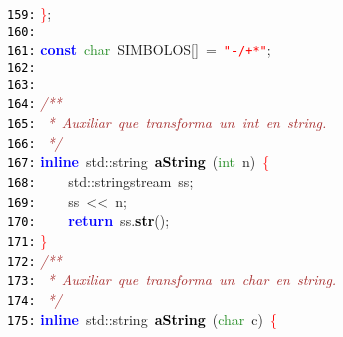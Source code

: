 \documentclass[a4paper,10pt]{scrartcl}
\begin{document}
{   \mbox{}\texttt{\textcolor{Black}{159:}} \textcolor{Red}{\}}\textcolor{BrickRed}{;} \\
   \mbox{}\texttt{\textcolor{Black}{160:}}  \\
   \mbox{}\texttt{\textcolor{Black}{161:}} \textbf{\textcolor{Blue}{const}}\ \textcolor{ForestGreen}{char}\ SIMBOLOS\textcolor{BrickRed}{[]}\ \textcolor{BrickRed}{=}\ \texttt{\textcolor{Red}{"{}-/+*"{}}}\textcolor{BrickRed}{;} \\
   \mbox{}\texttt{\textcolor{Black}{162:}}  \\
   \mbox{}\texttt{\textcolor{Black}{163:}}  \\
   \mbox{}\texttt{\textcolor{Black}{164:}} \textit{\textcolor{Brown}{/**}} \\
   \mbox{}\texttt{\textcolor{Black}{165:}} \textit{\textcolor{Brown}{\ *\ Auxiliar\ que\ transforma\ un\ int\ en\ string.}} \\
   \mbox{}\texttt{\textcolor{Black}{166:}} \textit{\textcolor{Brown}{\ */}} \\
   \mbox{}\texttt{\textcolor{Black}{167:}} \textbf{\textcolor{Blue}{inline}}\ std\textcolor{BrickRed}{::}\textcolor{TealBlue}{string}\ \textbf{\textcolor{Black}{aString}}\ \textcolor{BrickRed}{(}\textcolor{ForestGreen}{int}\ n\textcolor{BrickRed}{)}\ \textcolor{Red}{\{} \\
   \mbox{}\texttt{\textcolor{Black}{168:}} \ \ \ \ std\textcolor{BrickRed}{::}\textcolor{TealBlue}{stringstream}\ ss\textcolor{BrickRed}{;} \\
   \mbox{}\texttt{\textcolor{Black}{169:}} \ \ \ \ ss\ \textcolor{BrickRed}{\textless{}\textless{}}\ n\textcolor{BrickRed}{;} \\
   \mbox{}\texttt{\textcolor{Black}{170:}} \ \ \ \ \textbf{\textcolor{Blue}{return}}\ ss\textcolor{BrickRed}{.}\textbf{\textcolor{Black}{str}}\textcolor{BrickRed}{();} \\
   \mbox{}\texttt{\textcolor{Black}{171:}} \textcolor{Red}{\}} \\
   \mbox{}\texttt{\textcolor{Black}{172:}} \textit{\textcolor{Brown}{/**}} \\
   \mbox{}\texttt{\textcolor{Black}{173:}} \textit{\textcolor{Brown}{\ *\ Auxiliar\ que\ transforma\ un\ char\ en\ string.}} \\
   \mbox{}\texttt{\textcolor{Black}{174:}} \textit{\textcolor{Brown}{\ */}} \\
   \mbox{}\texttt{\textcolor{Black}{175:}} \textbf{\textcolor{Blue}{inline}}\ std\textcolor{BrickRed}{::}\textcolor{TealBlue}{string}\ \textbf{\textcolor{Black}{aString}}\ \textcolor{BrickRed}{(}\textcolor{ForestGreen}{char}\ c\textcolor{BrickRed}{)}\ \textcolor{Red}{\{} \\
}
\end{document}
